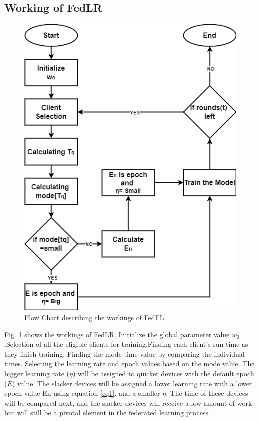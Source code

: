 \documentclass[conference]{IEEEtran}
\begin{document}
\subsection{Working of FedLR}
\begin{figure}[htp!]
	\centering
	\includegraphics[scale=.28]{Images/Result Images/Flow_FedLR }
	\caption{Flow Chart describing the workings of FedFL.}
	\label{FlowFedLR}
\end{figure}
Fig. \ref{FlowFedLR} shows the workings of FedLR. Initialize the global parameter value $w_0$.Selection of all the eligible clients for training.Finding each client’s run-time as they finish training. Finding the mode time value by comparing the individual times. Selecting the learning rate and epoch values based on the mode value. The bigger learning rate ($\eta$) will be assigned to quicker devices with the default epoch ($E$) value. The slacker devices will be assigned a lower learning rate with a lower epoch value En using equation \ref{eq1}. and a smaller $\eta$. The time of these devices will be compared next, and the
slacker devices will receive a low amount of work but will still be a pivotal element in the federated learning process.
\end{document}
